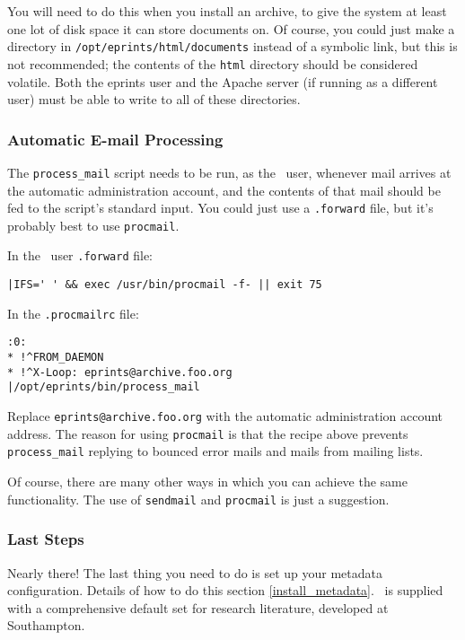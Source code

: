 You will need to do this when you install an \eprints archive, to give the system at least one lot of disk space it can store documents on. Of course, you could just make a directory in {\tt /opt/eprints/html/documents} instead of a symbolic link, but this is not recommended; the contents of the {\tt html} directory should be considered volatile. Both the eprints user and the Apache server (if running as a different user) must be able to write to all of these directories.


\subsubsection{Automatic E-mail Processing}

The {\tt process\_mail} script needs to be run, as the \eprints\ user, whenever mail arrives at the automatic administration account, and the contents of that mail should be fed to the script's standard input. You could just use a {\tt .forward} file, but it's probably best to use {\tt procmail}.

In the \eprints\ user {\tt .forward} file:

\begin{verbatim}
|IFS=' ' && exec /usr/bin/procmail -f- || exit 75
\end{verbatim}

In the {\tt .procmailrc} file:

\begin{verbatim}
:0:
* !^FROM_DAEMON
* !^X-Loop: eprints@archive.foo.org
|/opt/eprints/bin/process_mail
\end{verbatim}

Replace {\tt eprints@archive.foo.org} with the automatic administration account address. The reason for using {\tt procmail} is that the recipe above prevents {\tt process\_mail} replying to bounced error mails and mails from mailing lists.

Of course, there are many other ways in which you can achieve the same functionality. The use of {\tt sendmail} and {\tt procmail} is just a suggestion.


\subsubsection{Last Steps}
\label{install_last_steps}

Nearly there! The last thing you need to do is set up your metadata configuration. Details of how to do this section \ref{install_metadata}. \eprints\ is supplied with a comprehensive default set for research literature, developed at Southampton.

